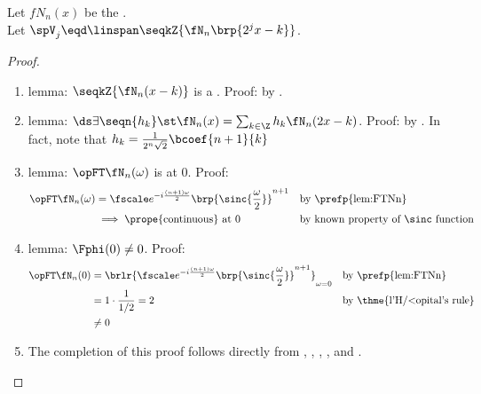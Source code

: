 \begin{theorem}
\label{thm:Nmra}
Let $fN_n(x)$ be the  .\\
Let $\spV_j\eqd\linspan\seqkZ{\fN_n\brp{2^jx-k}}$.
\end{theorem}
\begin{proof}
\begin{enumerate}
  \item lemma: $\seqkZ{\fN_n(x-k)}$ is a . \label{ilem:Nmra_riesz}
        Proof: by .

  \item lemma: $\ds\exists \seqn{h_k} \st \fN_n(x)=\sum_{k\in\Z}h_k\fN_n(2x-k)$. \label{ilem:Nmra_2x}
        Proof: by .
        In fact, note that $h_k = \frac{1}{2^n\sqrt{2}}\bcoef{n+1}{k}$

  \item lemma: $\opFT\fN_n(\omega)$ is  at $0$. \label{ilem:Nmra_continuous} Proof:
    \begin{align*}
      \opFT\fN_n(\omega) 
        &= \fscale e^{-i\frac{(n+1)\omega}{2}} \brp{\sinc{\frac{\omega}{2}}}^{n+1}
        && \text{by \prefp{lem:FTNn}}
      \\&\implies\text{\prope{continuous} at $0$} 
        && \text{by known property of $\sinc$ function}
    \end{align*}

  \item lemma: $\Fphi(0)\neq0$. \label{ilem:Nmra_neq0} Proof:
    \begin{align*}
      \opFT\fN_n(0) 
        &= \brlr{\fscale e^{-i\frac{(n+1)\omega}{2}} \brp{\sinc{\frac{\omega}{2}}}^{n+1}}_{\omega=0}
        && \text{by \prefp{lem:FTNn}}
      \\&= 1\cdot\frac{1}{1/2} = 2
        && \text{by \thme{l'H{/<o}pital's rule}}
      \\&\neq 0
    \end{align*}

  \item The completion of this proof follows directly from 
        , , , , and 
        .
\end{enumerate}
\end{proof}

